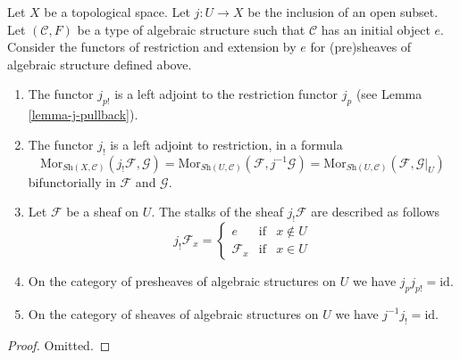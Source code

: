 \begin{lemma}
\label{lemma-j-shriek-structures}
Let $X$ be a topological space.
Let $j : U \to X$ be the inclusion of an open subset.
Let $(\mathcal{C}, F)$ be a type of algebraic structure
such that $\mathcal{C}$ has an initial object $e$.
Consider the functors of restriction and extension
by $e$ for (pre)sheaves of algebraic structure defined above.
\begin{enumerate}
\item The functor $j_{p!}$ is a left adjoint to the
restriction functor $j_p$ (see Lemma \ref{lemma-j-pullback}).
\item The functor $j_!$ is a left adjoint to restriction,
in a formula
$$
\text{Mor}_{\textit{Sh}(X, \mathcal{C})}(j_!\mathcal{F}, \mathcal{G})
=
\text{Mor}_{\textit{Sh}(U, \mathcal{C})}(\mathcal{F}, j^{-1}\mathcal{G})
=
\text{Mor}_{\textit{Sh}(U, \mathcal{C})}(\mathcal{F}, \mathcal{G}|_U)
$$
bifunctorially in $\mathcal{F}$ and $\mathcal{G}$.
\item Let $\mathcal{F}$ be a sheaf on $U$.
The stalks of the sheaf $j_!\mathcal{F}$ are described
as follows
$$
j_{!}\mathcal{F}_x =
\left\{
\begin{matrix}
e & \text{if} & x \not \in U \\
\mathcal{F}_x & \text{if} & x \in U
\end{matrix}
\right.
$$
\item On the category of presheaves of algebraic structures on $U$
we have $j_pj_{p!} = \text{id}$.
\item On the category of sheaves of algebraic structures on $U$
we have $j^{-1}j_! = \text{id}$.
\end{enumerate}
\end{lemma}

\begin{proof}
Omitted.
\end{proof}

